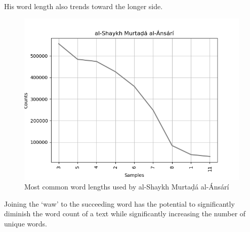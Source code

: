 \documentclass[12pt, oneside]{report}
\begin{document}
His word length also trends toward the longer side.
\begin{figure}[htb]
	\centering
	\includegraphics[width=15cm]{figures/word-length-shaykh-murtada.png}
	\caption[Most common word lengths used by al-Shaykh Murtaḍ\'{a} al-\'{A}ns\'{a}r\'{i}]{Most common word lengths used by al-Shaykh Murtaḍ\'{a} al-\'{A}ns\'{a}r\'{i}}
	\label{fig:word-length-murtada-ansari}
\end{figure}




Joining the `waw' to the succeeding word has the potential to significantly diminish the word count of a text while significantly increasing the number of unique words.
\end{document}
